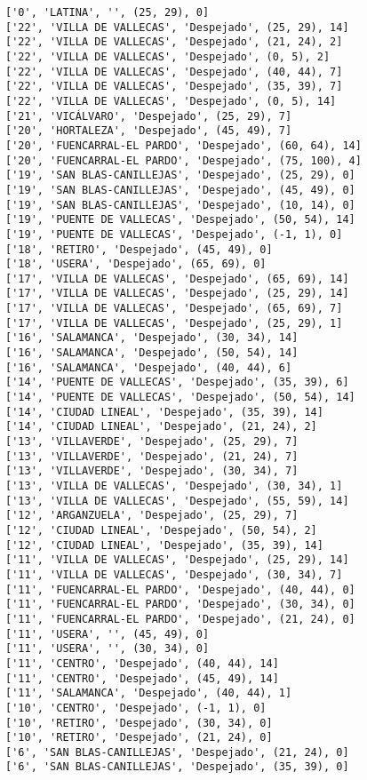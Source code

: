 \documentclass[11pt]{article}
\begin{document}
\begin{Verbatim}[commandchars=\\\{\}]
['0', 'LATINA', '', (25, 29), 0]
['22', 'VILLA DE VALLECAS', 'Despejado', (25, 29), 14]
['22', 'VILLA DE VALLECAS', 'Despejado', (21, 24), 2]
['22', 'VILLA DE VALLECAS', 'Despejado', (0, 5), 2]
['22', 'VILLA DE VALLECAS', 'Despejado', (40, 44), 7]
['22', 'VILLA DE VALLECAS', 'Despejado', (35, 39), 7]
['22', 'VILLA DE VALLECAS', 'Despejado', (0, 5), 14]
['21', 'VICÁLVARO', 'Despejado', (25, 29), 7]
['20', 'HORTALEZA', 'Despejado', (45, 49), 7]
['20', 'FUENCARRAL-EL PARDO', 'Despejado', (60, 64), 14]
['20', 'FUENCARRAL-EL PARDO', 'Despejado', (75, 100), 4]
['19', 'SAN BLAS-CANILLEJAS', 'Despejado', (25, 29), 0]
['19', 'SAN BLAS-CANILLEJAS', 'Despejado', (45, 49), 0]
['19', 'SAN BLAS-CANILLEJAS', 'Despejado', (10, 14), 0]
['19', 'PUENTE DE VALLECAS', 'Despejado', (50, 54), 14]
['19', 'PUENTE DE VALLECAS', 'Despejado', (-1, 1), 0]
['18', 'RETIRO', 'Despejado', (45, 49), 0]
['18', 'USERA', 'Despejado', (65, 69), 0]
['17', 'VILLA DE VALLECAS', 'Despejado', (65, 69), 14]
['17', 'VILLA DE VALLECAS', 'Despejado', (25, 29), 14]
['17', 'VILLA DE VALLECAS', 'Despejado', (65, 69), 7]
['17', 'VILLA DE VALLECAS', 'Despejado', (25, 29), 1]
['16', 'SALAMANCA', 'Despejado', (30, 34), 14]
['16', 'SALAMANCA', 'Despejado', (50, 54), 14]
['16', 'SALAMANCA', 'Despejado', (40, 44), 6]
['14', 'PUENTE DE VALLECAS', 'Despejado', (35, 39), 6]
['14', 'PUENTE DE VALLECAS', 'Despejado', (50, 54), 14]
['14', 'CIUDAD LINEAL', 'Despejado', (35, 39), 14]
['14', 'CIUDAD LINEAL', 'Despejado', (21, 24), 2]
['13', 'VILLAVERDE', 'Despejado', (25, 29), 7]
['13', 'VILLAVERDE', 'Despejado', (21, 24), 7]
['13', 'VILLAVERDE', 'Despejado', (30, 34), 7]
['13', 'VILLA DE VALLECAS', 'Despejado', (30, 34), 1]
['13', 'VILLA DE VALLECAS', 'Despejado', (55, 59), 14]
['12', 'ARGANZUELA', 'Despejado', (25, 29), 7]
['12', 'CIUDAD LINEAL', 'Despejado', (50, 54), 2]
['12', 'CIUDAD LINEAL', 'Despejado', (35, 39), 14]
['11', 'VILLA DE VALLECAS', 'Despejado', (25, 29), 14]
['11', 'VILLA DE VALLECAS', 'Despejado', (30, 34), 7]
['11', 'FUENCARRAL-EL PARDO', 'Despejado', (40, 44), 0]
['11', 'FUENCARRAL-EL PARDO', 'Despejado', (30, 34), 0]
['11', 'FUENCARRAL-EL PARDO', 'Despejado', (21, 24), 0]
['11', 'USERA', '', (45, 49), 0]
['11', 'USERA', '', (30, 34), 0]
['11', 'CENTRO', 'Despejado', (40, 44), 14]
['11', 'CENTRO', 'Despejado', (45, 49), 14]
['11', 'SALAMANCA', 'Despejado', (40, 44), 1]
['10', 'CENTRO', 'Despejado', (-1, 1), 0]
['10', 'RETIRO', 'Despejado', (30, 34), 0]
['10', 'RETIRO', 'Despejado', (21, 24), 0]
['6', 'SAN BLAS-CANILLEJAS', 'Despejado', (21, 24), 0]
['6', 'SAN BLAS-CANILLEJAS', 'Despejado', (35, 39), 0]

\end{Verbatim}
\end{document}

